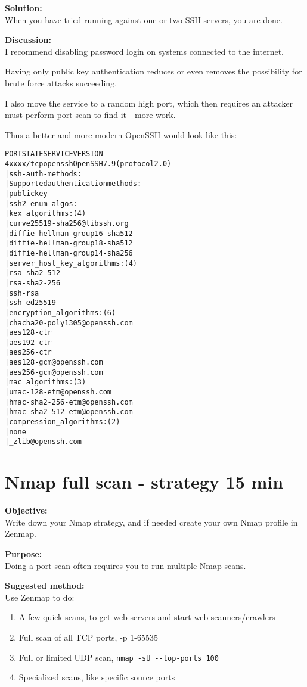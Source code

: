 \documentclass[a4paper,11pt,notitlepage]{report}
\begin{document}
{\bf Solution:}\\
When you have tried running against one or two SSH servers, you are done.

{\bf Discussion:}\\
I recommend disabling password login on systems connected to the internet.

Having only public key authentication reduces or even removes the possibility for brute force attacks succeeding.

I also move the service to a random high port, which then requires an attacker must perform port scan to find it - more work.

Thus a better and more modern OpenSSH would look like this:
\begin{alltt}\footnotesize
PORT      STATE SERVICE VERSION
4xxxx/tcp open  ssh     OpenSSH 7.9 (protocol 2.0)
| ssh-auth-methods:
|   Supported authentication methods:
|     publickey
| ssh2-enum-algos:
|   kex_algorithms: (4)
|       curve25519-sha256@libssh.org
|       diffie-hellman-group16-sha512
|       diffie-hellman-group18-sha512
|       diffie-hellman-group14-sha256
|   server_host_key_algorithms: (4)
|       rsa-sha2-512
|       rsa-sha2-256
|       ssh-rsa
|       ssh-ed25519
|   encryption_algorithms: (6)
|       chacha20-poly1305@openssh.com
|       aes128-ctr
|       aes192-ctr
|       aes256-ctr
|       aes128-gcm@openssh.com
|       aes256-gcm@openssh.com
|   mac_algorithms: (3)
|       umac-128-etm@openssh.com
|       hmac-sha2-256-etm@openssh.com
|       hmac-sha2-512-etm@openssh.com
|   compression_algorithms: (2)
|       none
|_      zlib@openssh.com
\end{alltt}


\chapter{Nmap full scan - strategy 15 min}
\label{ex:nmap-strategy}


{\bf Objective:} \\
Write down your Nmap strategy, and if needed create your own Nmap profile in Zenmap.


{\bf Purpose:}\\
Doing a port scan often requires you to run multiple Nmap scans.


{\bf Suggested method:}\\
Use Zenmap to do:
\begin{enumerate}
\item A few quick scans, to get web servers and start web scanners/crawlers
\item Full scan of all TCP ports, -p 1-65535
\item Full or limited UDP scan, \verb+nmap -sU --top-ports 100+
\item Specialized scans, like specific source ports
\end{enumerate}
\end{document}
